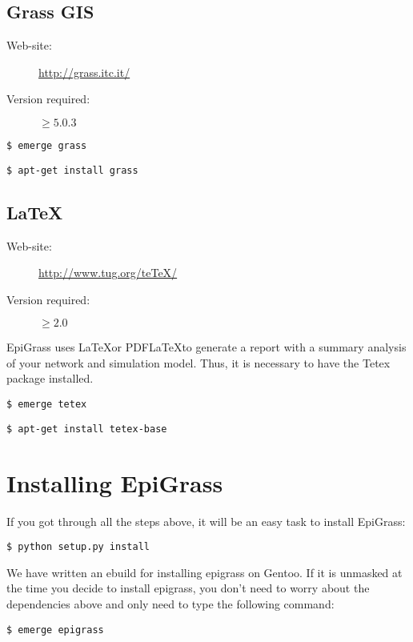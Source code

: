 \subsection{Grass GIS}
\begin{description}
\item[Web-site:] \url{http://grass.itc.it/}
\item[Version required:] $\geq5.0.3$
\end{description}
\begin{lstlisting}[frame=trBL, caption=Installing GRASS on Gentoo GNU/Linux ,label=lst:instgrassg]
$ emerge grass
\end{lstlisting}

\begin{lstlisting}[frame=trBL, caption=Installing GRASS on Debian GNU/Linux ,label=lst:instgrassd]
$ apt-get install grass
\end{lstlisting}

\subsection{\LaTeX}
\begin{description}
\item[Web-site:] \url{http://www.tug.org/teTeX/}
\item[Version required:] $\geq2.0$
\end{description}
EpiGrass uses \LaTeX  or PDF\LaTeX  to generate a report with a summary analysis of your network and simulation model. Thus, it is necessary to have the Tetex package installed.
\begin{lstlisting}[frame=trBL, caption=Installing \LaTeX and PDF\LaTeX on Gentoo GNU/Linux ,label=lst:insttexg]
$ emerge tetex
\end{lstlisting}

\begin{lstlisting}[frame=trBL, caption=Installing \LaTeX and PDF\LaTeX on Debian GNU/Linux ,label=lst:insttexd]
$ apt-get install tetex-base
\end{lstlisting}

\section{Installing EpiGrass}
If you got through all the steps above, it will be an easy task to install EpiGrass:
\begin{lstlisting}[frame=trBL, caption=Intalling EpiGrass ,label=lst:instepg]
$ python setup.py install
\end{lstlisting}

We have written an ebuild for installing epigrass on Gentoo. If it is unmasked at the time you decide to install epigrass, you don't need to worry about the dependencies above and only need to type the following command:
\begin{lstlisting}[frame=trBL, caption=Installing EpiGrass on Gentoo GNU/Linux ,label=lst:instepgg]
$ emerge epigrass
\end{lstlisting}